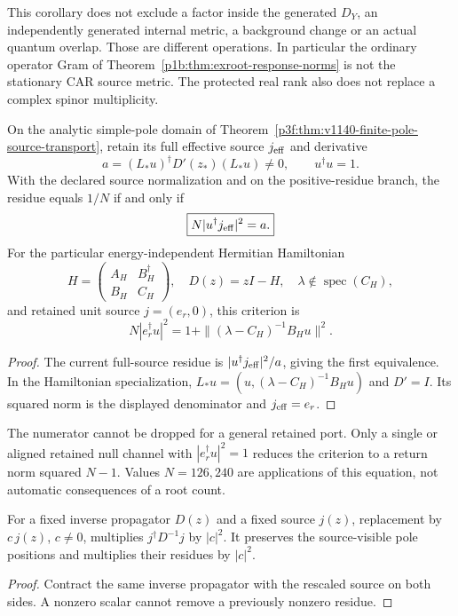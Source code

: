 \documentclass[11pt,a4paper]{article}
\begin{document}
This corollary does not exclude a factor inside the generated \(D_Y\),
an independently generated internal metric, a background change or an
actual quantum overlap. Those are different operations. In particular
the ordinary operator Gram of Theorem~\ref{p1b:thm:exroot-response-norms}
is not the stationary CAR source metric. The protected real rank also
does not replace a complex spinor multiplicity.

\begin{corollary}
\label{p3f:cor:exroot-residue-criterion}
On the analytic simple-pole domain of
Theorem~\ref{p3f:thm:v1140-finite-pole-source-transport}, retain its
full effective source \(j_{\rm eff}\) and derivative
\[
 a=(L_*u)^\dagger D'(z_*)(L_*u)\ne0,\qquad u^\dagger u=1.
\]
With the declared source normalization and on the positive-residue
branch, the residue equals \(1/N\) if and only if
\[
 \boxed{N|u^\dagger j_{\rm eff}|^2=a.}
\]
For the particular energy-independent Hermitian Hamiltonian
\[
 H=\begin{pmatrix}A_H&B_H^\dagger\\B_H&C_H\end{pmatrix},
 \quad D(z)=zI-H,\quad
 \lambda\notin\operatorname{spec}(C_H),
\]
and retained unit source \(j=(e_r,0)\), this criterion is
\[
 \boxed{N|e_r^\dagger u|^2
 =1+\|(\lambda-C_H)^{-1}B_Hu\|^2.}
\]
\end{corollary}
\begin{proof}
The current full-source residue is
\(|u^\dagger j_{\rm eff}|^2/a\), giving the first equivalence.
In the Hamiltonian specialization,
\(L_*u=(u,(\lambda-C_H)^{-1}B_Hu)\) and \(D'=I\).
Its squared norm is the displayed denominator and \(j_{\rm eff}=e_r\).
\end{proof}

The numerator cannot be dropped for a general retained port.
Only a single or aligned retained null channel with
\(|e_r^\dagger u|^2=1\) reduces the criterion to a return norm squared
\(N-1\). Values \(N=126,240\) are applications of this equation, not
automatic consequences of a root count.

\begin{proposition}
\label{p3f:prop:exroot-source-scale-poles}
For a fixed inverse propagator \(D(z)\) and a fixed source \(j(z)\),
replacement by \(c\,j(z)\), \(c\ne0\), multiplies
\(j^\dagger D^{-1}j\) by \(|c|^2\). It preserves the source-visible
pole positions and multiplies their residues by \(|c|^2\).
\end{proposition}
\begin{proof}
Contract the same inverse propagator with the rescaled source on both
sides. A nonzero scalar cannot remove a previously nonzero residue.
\end{proof}
\end{document}
